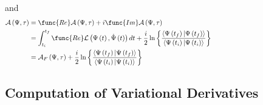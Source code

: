 \documentclass[aps,preprint]{revtex4}
\begin{document}
and 
\begin{align}
\mathcal{A}\left( \Psi,\tau\right) & =\func{Re}\mathcal{A}\left(
\Psi,\tau\right) +i\func{Im}\mathcal{A}\left( \Psi,\tau\right)
\qquad\qquad\qquad\qquad\qquad\qquad\qquad\qquad\qquad\qquad\qquad  \notag \\
& =\int_{t_{i}}^{t_{f}}\func{Re}\mathcal{L}\left( \Psi\left( t\right) ,\dot{%
\Psi}\left( t\right) \right) dt+\frac{i}{2}\ln\left\{ \frac{\left\langle
\Psi\left( t_{f}\right) |\Psi\left( t_{f}\right) \right\rangle }{%
\left\langle \Psi\left( t_{i}\right) |\Psi\left( t_{i}\right) \right\rangle }%
\right\}  \notag \\
& =\mathcal{A}_{F}\left( \Psi,\tau\right) +\frac{i}{2}\ln\left\{ \frac{%
\left\langle \Psi\left( t_{f}\right) |\Psi\left( t_{f}\right) \right\rangle 
}{\left\langle \Psi\left( t_{i}\right) |\Psi\left( t_{i}\right)
\right\rangle }\right\}
\end{align}

\subsection{Computation of Variational Derivatives}
\end{document}
